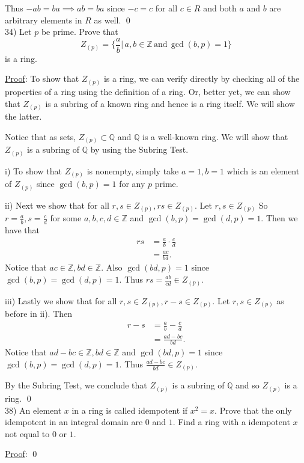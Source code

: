 \documentclass{article}
\begin{document}
Thus $-ab = ba \implies ab = ba$ since $-c = c$ for all $c \in R$ and both $a$ and $b$ are arbitrary elements in $R$ as well. \qed \\

34) Let $p$ be prime. Prove that
$$Z_{(p)} = \big\{ \frac{a}{b} \big\vert \, a, b \in \mathbb{Z} \, \text{and} \, \gcd(b, p) = 1 \big\} $$
is a ring. 

\underline{Proof}: To show that $Z_{(p)}$ is a ring, we can verify directly by checking all of the properties of a ring using the definition of a ring. Or, better yet, we can show that $Z_{(p)}$ is a subring of a known ring and hence is a ring itself. We will show the latter.

Notice that as sets, $Z_{(p)} \subset \mathbb{Q}$ and $\mathbb{Q}$ is a well-known ring. We will show that $Z_{(p)}$ is a subring of $\mathbb{Q}$ by using the Subring Test.

i) To show that $Z_{(p)}$ is nonempty, simply take $a = 1, b = 1$ which is an element of $Z_{(p)}$ since $\gcd(b, p) = 1$ for any $p$ prime.

ii) Next we show that for all $r, s \in Z_{(p)}, rs \in Z_{(p)}$. Let $r, s \in Z_{(p)}$ So $r = \frac ab, s = \frac cd$ for some $a, b, c, d \in \mathbb{Z}$ and $\gcd(b, p) = \gcd(d, p) = 1$. Then we have that
\begin{align*}
	rs &= \frac ab \cdot \frac cd \\
	&= \frac{ac}{bd}.
\end{align*}
Notice that $ac \in \mathbb{Z}, bd \in \mathbb{Z}$. Also $\gcd(bd, p) = 1$ since $\gcd(b, p) = \gcd(d, p) = 1$. Thus $rs = \frac{ab}{cd} \in Z_{(p)}$.

iii) Lastly we show that for all $r, s \in Z_{(p)}, r - s \in Z_{(p)}$. Let $r, s \in Z_{(p)}$ as before in ii). Then 
\begin{align*}
	r - s &= \frac ab - \frac cd \\
	&= \frac{ad-bc}{bd}.
\end{align*}
Notice that $ad - bc \in \mathbb{Z}, bd \in \mathbb{Z}$ and $\gcd(bd, p) = 1$ since $\gcd(b, p) = \gcd(d, p) = 1$. Thus $\frac{ad-bc}{bd} \in Z_{(p)}.$

By the Subring Test, we conclude that $Z_{(p)}$ is a subring of $\mathbb{Q}$ and so $Z_{(p)}$ is a ring. \qed \\

38) An element $x$ in a ring is called idempotent if $x^2 = x$. Prove that the only idempotent in an integral domain are $0$ and $1$. Find a ring with a idempotent $x$ not equal to $0$ or $1$. 

\underline{Proof}: \qed \\
\end{document}
